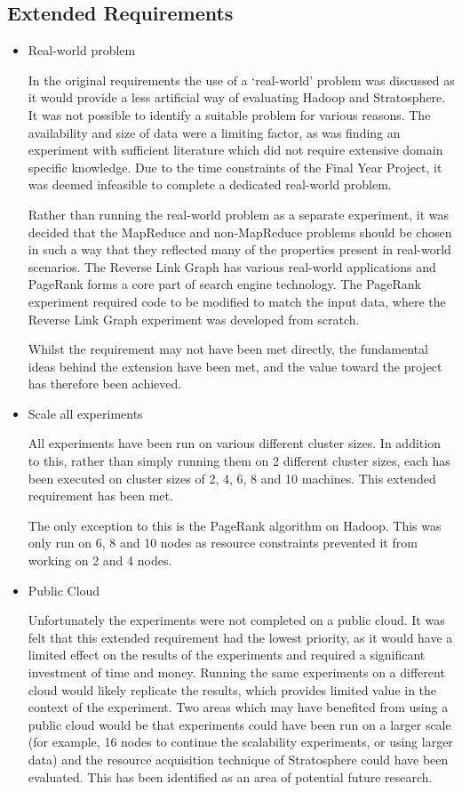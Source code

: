 \subsection{Extended Requirements}
\begin{itemize}
	\item Real-world problem

	In the original requirements the use of a `real-world' problem was discussed as it would provide a less artificial way of evaluating Hadoop and Stratosphere. It was not possible to identify a suitable problem for various reasons. The availability and size of data were a limiting factor, as was finding an experiment with sufficient literature which did not require extensive domain specific knowledge. Due to the time constraints of the Final Year Project, it was deemed infeasible to complete a dedicated real-world problem.

	Rather than running the real-world problem as a separate experiment, it was decided that the MapReduce and non-MapReduce problems should be chosen in such a way that they reflected many of the properties present in real-world scenarios. The Reverse Link Graph has various real-world applications and PageRank forms a core part of search engine technology. The PageRank experiment required code to be modified to match the input data, where the Reverse Link Graph experiment was developed from scratch.

	Whilst the requirement may not have been met directly, the fundamental ideas behind the extension have been met, and the value toward the project has therefore been achieved.

	\item Scale all experiments

	All experiments have been run on various different cluster sizes. In addition to this, rather than simply running them on 2 different cluster sizes, each has been executed on cluster sizes of 2, 4, 6, 8 and 10 machines. This extended requirement has been met. 

	The only exception to this is the PageRank algorithm on Hadoop. This was only run on 6, 8 and 10 nodes as resource constraints prevented it from working on 2 and 4 nodes. 

	\item Public Cloud

	Unfortunately the experiments were not completed on a public cloud. It was felt that this extended requirement had the lowest priority, as it would have a limited effect on the results of the experiments and required a significant investment of time and money. Running the same experiments on a different cloud would likely replicate the results, which provides limited value in the context of the experiment. Two areas which may have benefited from using a public cloud would be that experiments could have been run on a larger scale (for example, 16 nodes to continue the scalability experiments, or using larger data) and the resource acquisition technique of Stratosphere could have been evaluated. This has been identified as an area of potential future research.
\end{itemize}

